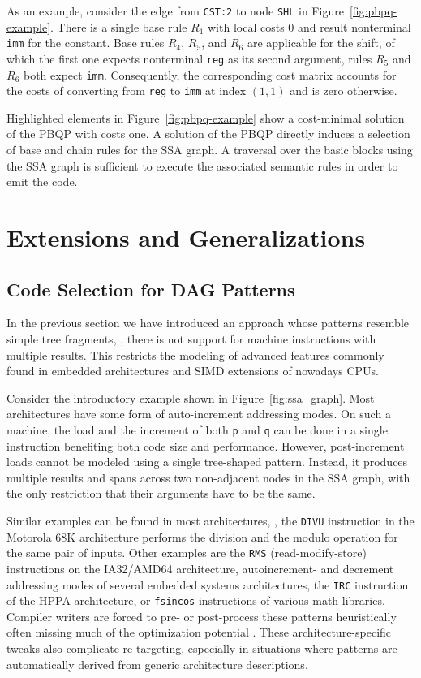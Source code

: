 As an example, consider the edge from \texttt{CST:2} to node
\texttt{SHL} in Figure~\ref{fig:pbpq-example}. There is a single base
rule $R_1$ with local costs 0 and result nonterminal \texttt{imm} for
the constant. Base rules $R_4$, $R_5$, and $R_6$ are applicable for
the shift, of which the first one expects nonterminal \texttt{reg} as
its second argument, rules $R_5$ and $R_6$ both expect
\texttt{imm}. Consequently, the corresponding cost matrix accounts for
the costs of converting from \texttt{reg} to \texttt{imm} at index
$(1,1)$ and is zero otherwise.

Highlighted elements in Figure~\ref{fig:pbpq-example} show a
cost-minimal solution of the PBQP with costs one. A solution of the
PBQP directly induces a selection of base and chain rules for the SSA
graph. A traversal over the basic blocks using the SSA graph is
sufficient to execute the associated semantic rules in order to emit
the code.

\section{Extensions and Generalizations}

\subsection{Code Selection for DAG Patterns}
\label{sec:dag_patterns}
In the previous section we have introduced an approach whose
patterns resemble simple tree fragments, \eg, there is not support for
machine instructions with multiple results. This restricts the
modeling of advanced features commonly found in embedded
architectures and SIMD extensions of nowadays CPUs.

Consider the introductory example shown
in Figure~\ref{fig:ssa_graph}. Most architectures have some form of
auto-increment addressing modes. On such a machine, the load and the
increment of both \texttt{p} and \texttt{q} can be done in a single
instruction benefiting both code size and performance. However,
post-increment loads cannot be modeled using a single tree-shaped
pattern. Instead, it produces multiple results and spans across two
non-adjacent nodes in the SSA graph, with the only restriction that
their arguments have to be the same.

Similar examples can be found in most architectures, \eg, the
\texttt{DIVU} instruction in the Motorola 68K architecture performs
the division and the modulo operation for the same pair of
inputs. Other examples are the \texttt{RMS} (read-modify-store)
instructions on the IA32/AMD64 architecture, autoincrement- and
decrement addressing modes of several embedded systems architectures,
the \texttt{IRC} instruction of the HPPA architecture, or
\texttt{fsincos} instructions of various math libraries. Compiler
writers are forced to pre- or post-process these patterns
heuristically often missing much of the optimization potential
\cite{Ebner08}. These architecture-specific tweaks also complicate
re-targeting, especially in situations where patterns are
automatically derived from generic architecture descriptions.


